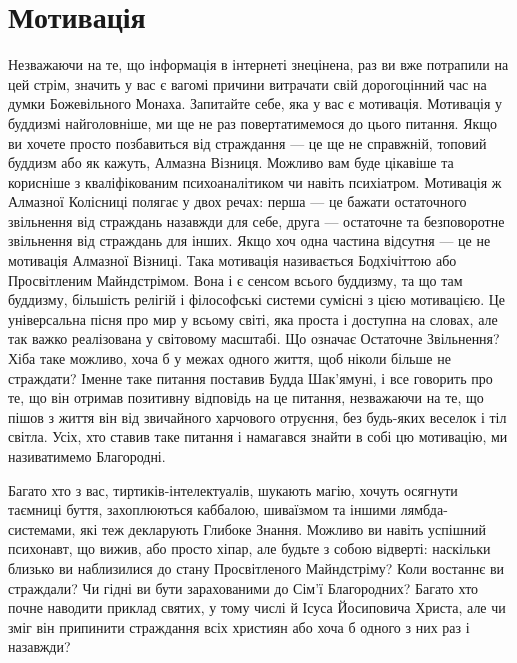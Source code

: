 \section{Мотивація}

Незважаючи на те, що інформація в інтернеті знецінена,
раз ви вже потрапили на цей стрім, значить у вас є вагомі
причини витрачати свій дорогоцінний час на думки Божевільного
Монаха. Запитайте себе, яка у вас є мотивація. Мотивація
у буддизмі найголовніше, ми ще не раз повертатимемося
до цього питання. Якщо ви хочете просто позбавиться від
страждання --- це ще не справжній, топовий буддизм або
як кажуть, Алмазна Візниця. Можливо вам буде
цікавіше та корисніше з кваліфікованим психоаналітиком
чи навіть психіатром. Мотивація ж Алмазної Колісниці
полягає у двох речах: перша --- це бажати остаточного
звільнення від страждань назавжди для себе, друга ---
остаточне та безповоротне звільнення від страждань
для інших. Якщо хоч одна частина відсутня --- це не мотивація
Алмазної Візниці. Така мотивація називається Бодхічіттою
або Просвітленим Майндстрімом. Вона і є сенсом всього
буддизму, та що там буддизму, більшість релігій і
філософські системи сумісні з цією мотивацією. Це
універсальна пісня про мир у всьому світі, яка проста
і доступна на словах, але так важко реалізована у світовому
масштабі. Що означає Остаточне Звільнення? Хіба
таке можливо, хоча б у межах одного життя, щоб ніколи
більше не страждати? Іменне таке питання поставив Будда
Шак'ямуні, і все говорить про те, що він отримав позитивну
відповідь на це питання, незважаючи на те, що пішов
з життя він від звичайного харчового отруєння,
без будь-яких веселок і тіл світла. Усіх, хто ставив
таке питання і намагався знайти в собі цю мотивацію,
ми називатимемо Благородні.

Багато хто з вас, тиртиків-інтелектуалів, шукають
магію, хочуть осягнути таємниці буття, захоплюються
каббалою, шиваїзмом та іншими лямбда-системами,
які теж декларують Глибоке Знання. Можливо ви
навіть успішний психонавт, що вижив, або просто хіпар,
але будьте з собою відверті: наскільки близько
ви наблизилися до стану Просвітленого Майндстріму?
Коли востаннє ви страждали? Чи гідні ви бути зарахованими
до Сім'ї Благородних? Багато хто почне наводити
приклад святих, у тому числі й Ісуса Йосиповича Христа,
але чи зміг він припинити страждання всіх християн
або хоча б одного з них раз і назавжди?

